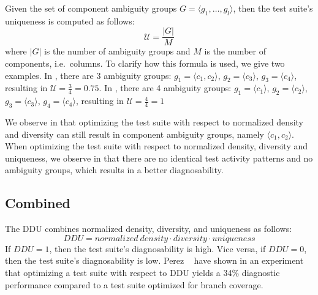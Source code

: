 \documentclass[twoside,a4paper,11pt]{memoir}
\begin{document}
Given the set of component ambiguity groups \(G = \langle g_1, \dots, g_l \rangle \), then the test suite's uniqueness is computed as follows:
\begin{equation}
  \label{eq:uniqueness}
  \mathcal{U} = \frac{|G|}{M}
\end{equation}
where \(|G|\) is the number of ambiguity groups and \(M\) is the number of components, i.e.\ columns.
To clarify how this formula is used, we give two examples.
In , there are 3 ambiguity groups: \( g_1 = \langle c_1, c_2 \rangle \), \( g_2 = \langle c_3 \rangle \), \( g_3 = \langle c_4 \rangle \), resulting in \( \mathcal{U} = \frac{3}{4} = 0.75 \).
In , there are 4 ambiguity groups: \( g_1 = \langle c_1 \rangle \), \( g_2 = \langle c_2 \rangle \), \( g_3 = \langle c_3 \rangle \), \( g_4 = \langle c_4 \rangle \), resulting in \( \mathcal{U} = \frac{4}{4} = 1 \)

We observe in  that optimizing the test suite with respect to normalized density and diversity can still result in component ambiguity groups, namely \(\langle c_1, c_2 \rangle \).
When optimizing the test suite with respect to normalized density, diversity and uniqueness, we observe in  that there are no identical test activity patterns and no ambiguity groups, which results in a better diagnosability.

\subsection{Combined}
The DDU combines normalized density, diversity, and uniqueness as follows:
\begin{equation}
 DDU = normalized\ density \cdot diversity \cdot uniqueness
\end{equation}
If \(DDU = 1 \), then the test suite's diagnosability is high.
Vice versa, if \(DDU = 0 \), then the test suite's diagnosability is low.
Perez \etal~\cite{DBLP:conf/icse/PerezAD17} have shown in an experiment that optimizing a test suite with respect to DDU yields a 34\% diagnostic performance compared to a test suite optimized for branch coverage.
\end{document}
